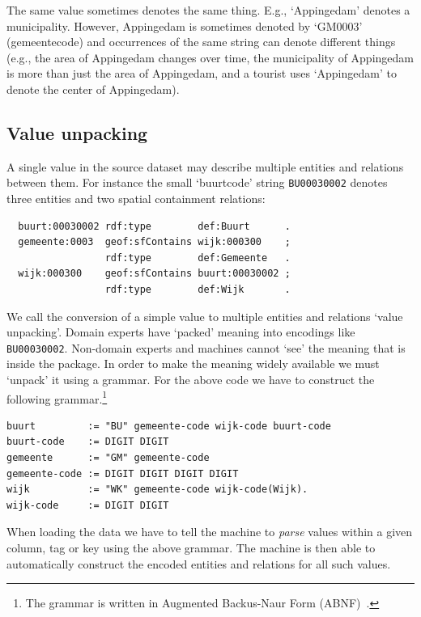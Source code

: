\documentclass[a4paper]{scrartcl}
\newcommand{\textt}[1]{{\small \texttt{#1}}}
\begin{document}
The same value sometimes denotes the same thing.  E.g., `Appingedam'
denotes a municipality.  However, Appingedam is sometimes denoted by
`GM0003' (gemeentecode) and occurrences of the same string can denote
different things (e.g., the area of Appingedam changes over time, the
municipality of Appingedam is more than just the area of Appingedam,
and a tourist uses `Appingedam' to denote the center of Appingedam).



\subsection{Value unpacking}
\label{sec:grammar}

A single value in the source dataset may describe multiple entities
and relations between them.  For instance the small `buurtcode' string
\textt{BU00030002} denotes three entities and two spatial containment
relations:

\begin{verbatim}
  buurt:00030002 rdf:type        def:Buurt      .
  gemeente:0003  geof:sfContains wijk:000300    ;
                 rdf:type        def:Gemeente   .
  wijk:000300    geof:sfContains buurt:00030002 ;
                 rdf:type        def:Wijk       .
\end{verbatim}

We call the conversion of a simple value to multiple entities and
relations `value unpacking'.  Domain experts have `packed' meaning
into encodings like \texttt{BU00030002}.  Non-domain experts and
machines cannot `see' the meaning that is inside the package.  In
order to make the meaning widely available we must `unpack' it using a
grammar.  For the above code we have to construct the following
grammar.\footnote{The grammar is written in Augmented Backus-Naur Form
  (ABNF)~\cite{Crocker2008}.}

\begin{verbatim}
buurt         := "BU" gemeente-code wijk-code buurt-code
buurt-code    := DIGIT DIGIT
gemeente      := "GM" gemeente-code
gemeente-code := DIGIT DIGIT DIGIT DIGIT
wijk          := "WK" gemeente-code wijk-code(Wijk).
wijk-code     := DIGIT DIGIT
\end{verbatim}

When loading the data we have to tell the machine to \emph{parse}
values within a given column, tag or key using the above grammar.  The
machine is then able to automatically construct the encoded entities
and relations for all such values.
\end{document}
